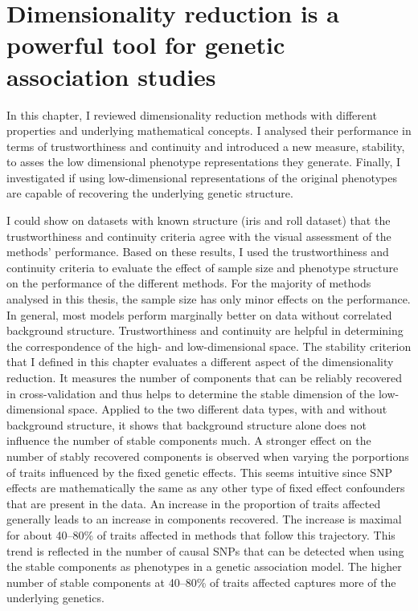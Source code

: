 \section{Dimensionality reduction is a powerful tool for genetic association studies}
In this chapter, I reviewed dimensionality reduction methods with different properties and underlying mathematical concepts. I analysed their performance in terms of trustworthiness and continuity and introduced a new measure, stability, to asses the low dimensional phenotype representations they generate. Finally, I investigated if using low-dimensional representations of the original phenotypes are capable of recovering the underlying genetic structure. 

I could show on datasets with known structure (iris and roll dataset) that the trustworthiness and continuity criteria agree with the visual assessment of the methods' performance. Based on these results, I used the trustworthiness and continuity criteria to evaluate the effect of sample size and phenotype structure on the performance of the different methods. For the majority of methods analysed in this thesis, the sample size has only minor effects on the performance. In general, most models perform marginally better on data without correlated background structure. Trustworthiness and continuity are helpful in determining the correspondence of the high- and low-dimensional space. The stability criterion that I defined in this chapter evaluates a different aspect of the dimensionality reduction. It measures the number of components that can be reliably recovered in cross-validation and thus helps to determine the stable dimension of the low-dimensional space. Applied to the two different data types, with and without background structure, it shows that background structure alone does not influence the number of stable components much. A stronger effect on the number of stably recovered components is observed when varying the porportions of traits influenced by the fixed genetic effects. This seems intuitive since SNP effects are mathematically the same as any other type of fixed effect confounders that are present in the data. An increase in the proportion of traits affected generally leads to an increase in components recovered. The increase is maximal for about \numrange{40}{80}\% of traits affected in methods that follow this trajectory. This trend is reflected in the number of causal SNPs that can be detected when using the stable components as phenotypes in a genetic association model. The higher number of stable components at \numrange{40}{80}\% of traits affected captures more of the underlying genetics. 

